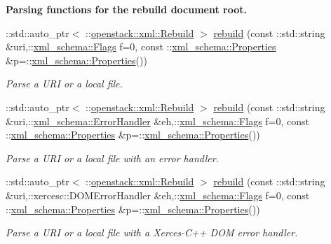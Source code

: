 \begin{Indent}{\bf Parsing functions for the rebuild document root.}\par
\begin{DoxyCompactItemize}
\item 
::std::auto\_\-ptr$<$ ::\hyperlink{classopenstack_1_1xml_1_1Rebuild}{openstack::xml::Rebuild} $>$ \hyperlink{namespaceopenstack_1_1xml_ab9e62232f65084ee89ed0fcd9b4ded41}{rebuild} (const ::std::string \&uri,::\hyperlink{namespacexml__schema_affb4c227cbd9aa7453dd1dc5a1401943}{xml\_\-schema::Flags} f=0, const ::\hyperlink{namespacexml__schema_ad27ce19a7ee1d3b1064092648898f64c}{xml\_\-schema::Properties} \&p=::\hyperlink{namespacexml__schema_ad27ce19a7ee1d3b1064092648898f64c}{xml\_\-schema::Properties}())
\begin{DoxyCompactList}\small\item\em Parse a URI or a local file. \item\end{DoxyCompactList}\item 
::std::auto\_\-ptr$<$ ::\hyperlink{classopenstack_1_1xml_1_1Rebuild}{openstack::xml::Rebuild} $>$ \hyperlink{namespaceopenstack_1_1xml_af73f8583599765bea77455bc3d66ec9b}{rebuild} (const ::std::string \&uri,::\hyperlink{namespacexml__schema_ab1c9361bfd3b404eaabf0c31eded79dc}{xml\_\-schema::ErrorHandler} \&eh,::\hyperlink{namespacexml__schema_affb4c227cbd9aa7453dd1dc5a1401943}{xml\_\-schema::Flags} f=0, const ::\hyperlink{namespacexml__schema_ad27ce19a7ee1d3b1064092648898f64c}{xml\_\-schema::Properties} \&p=::\hyperlink{namespacexml__schema_ad27ce19a7ee1d3b1064092648898f64c}{xml\_\-schema::Properties}())
\begin{DoxyCompactList}\small\item\em Parse a URI or a local file with an error handler. \item\end{DoxyCompactList}\item 
::std::auto\_\-ptr$<$ ::\hyperlink{classopenstack_1_1xml_1_1Rebuild}{openstack::xml::Rebuild} $>$ \hyperlink{namespaceopenstack_1_1xml_a249d2b807ab36c3489979983eb8ba5c6}{rebuild} (const ::std::string \&uri,::xercesc::DOMErrorHandler \&eh,::\hyperlink{namespacexml__schema_affb4c227cbd9aa7453dd1dc5a1401943}{xml\_\-schema::Flags} f=0, const ::\hyperlink{namespacexml__schema_ad27ce19a7ee1d3b1064092648898f64c}{xml\_\-schema::Properties} \&p=::\hyperlink{namespacexml__schema_ad27ce19a7ee1d3b1064092648898f64c}{xml\_\-schema::Properties}())
\begin{DoxyCompactList}\small\item\em Parse a URI or a local file with a Xerces-\/C++ DOM error handler. \item\end{DoxyCompactList}\item 

\end{DoxyCompactItemize}
\end{Indent}
